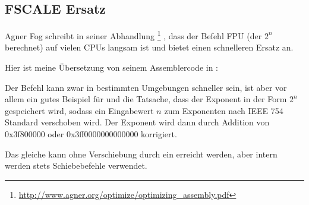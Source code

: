 \subsection{FSCALE Ersatz}
Agner Fog schreibt in seiner Abhandlung  \footnote{\url{http://www.agner.org/optimize/optimizing_assembly.pdf}} , dass der Befehl 
\ac{FPU} (der $2^n$ berechnet) auf vielen CPUs langsam ist und bietet einen schnelleren Ersatz an.

Hier ist meine Übersetzung von seinem Assemblercode in \CCpp:


Der Befehl  kann zwar in bestimmten Umgebungen schneller sein, ist aber vor allem ein gutes Beispiel für
 und die Tatsache, dass der Exponent in der Form $2^n$ gespeichert wird, sodass ein Eingabewert $n$ zum
Exponenten nach IEEE 754 Standard verschoben wird.
Der Exponent wird dann durch Addition von 0x3f800000 oder 0x3ff0000000000000 korrigiert.

Das gleiche kann ohne Verschiebung durch ein  erreicht werden, aber intern werden stets Schiebebefehle
verwendet.

